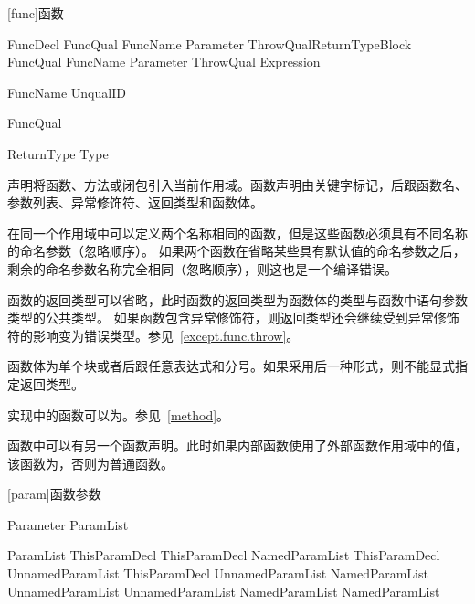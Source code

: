 
[func]{函数}

\begin{bnf}{FuncDecl}
    FuncQual\bnfs {} FuncName Parameter ThrowQual\bnfq ReturnType\bnfq Block \br
    FuncQual\bnfs {} FuncName Parameter ThrowQual\bnfq \terminal{=>} Expression \terminal{;}
\end{bnf}

\begin{bnf}{FuncName}
    UnqualID
\end{bnf}

\begin{bnf}{FuncQual}
     \br
     \br
     \br
\end{bnf}

\begin{bnf}{ReturnType}
    \terminal{->} Type
\end{bnf}

\pnum
{}声明将函数、方法或闭包引入当前作用域。函数声明由关键字标记，后跟函数名、参数列表、异常修饰符、返回类型和函数体。

\pnum
在同一个作用域中可以定义两个名称相同的函数，但是这些函数必须具有不同名称的命名参数（忽略顺序）。
如果两个函数在省略某些具有默认值的命名参数之后，剩余的命名参数名称完全相同（忽略顺序），则这也是一个编译错误。

\pnum
函数的返回类型可以省略，此时函数的返回类型为函数体的类型与函数中语句参数类型的公共类型。
如果函数包含异常修饰符，则返回类型还会继续受到异常修饰符的影响变为错误类型。参见~\ref{except.func.throw}。

\pnum
函数体为单个块或者\tcode{=>}后跟任意表达式和分号。如果采用后一种形式，则不能显式指定返回类型。

\pnum
实现中的函数可以为。参见~\ref{method}。

\pnum
函数中可以有另一个函数声明。此时如果内部函数使用了外部函数作用域中的值，该函数为，否则为普通函数。

[param]{函数参数}

\begin{bnf}{Parameter}
    \terminal{(} ParamList\bnfq \terminal{)}
\end{bnf}

\begin{bnf}{ParamList}
    ThisParamDecl \br
    ThisParamDecl \terminal{,} NamedParamList \br
    ThisParamDecl \terminal{,} UnnamedParamList \br
    ThisParamDecl \terminal{,} UnnamedParamList \terminal{,} NamedParamList \br
    UnnamedParamList \br
    UnnamedParamList \terminal{,} NamedParamList \br
    NamedParamList
\end{bnf}

